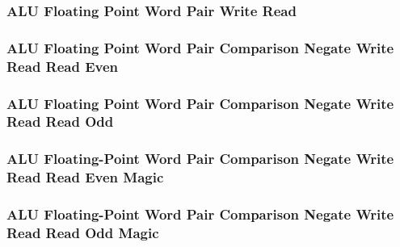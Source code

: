 

\subsubsection[{\small ALU Floating Point Word Pair Write Read}]{ALU Floating Point Word Pair Write Read} \label{sec:format-ALU-FWPWR}



\subsubsection[{\small ALU Floating Point Word Pair Comparison Negate Write Read Read Even}]{ALU Floating Point Word Pair Comparison Negate Write Read Read Even} \label{sec:format-ALU-FWPCNWRRE}



\subsubsection[{\small ALU Floating Point Word Pair Comparison Negate Write Read Read Odd}]{ALU Floating Point Word Pair Comparison Negate Write Read Read Odd} \label{sec:format-ALU-FWPCNWRRO}



\subsubsection[{\small ALU Floating-Point Word Pair Comparison Negate Write Read Read Even Magic}]{ALU Floating-Point Word Pair Comparison Negate Write Read Read Even Magic} \label{sec:format-ALU-FWPCNWRRE.M}



\subsubsection[{\small ALU Floating-Point Word Pair Comparison Negate Write Read Read Odd Magic}]{ALU Floating-Point Word Pair Comparison Negate Write Read Read Odd Magic} \label{sec:format-ALU-FWPCNWRRO.M}

